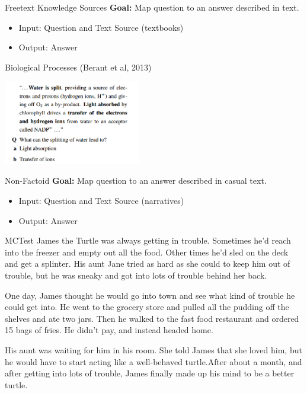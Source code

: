\documentclass{beamer}
\begin{document}
\begin{frame}{Freetext Knowledge Sources}
  \textbf{Goal:} Map question to an answer described in text.

  \begin{itemize}
  \item Input: Question and Text Source (textbooks)
  \item Output: Answer
  \end{itemize}
\end{frame}


\begin{frame}{Biological Processes (Berant et al, 2013)}
  \begin{center}
    \includegraphics[width=6cm]{water}
  \end{center}
\end{frame}

  

\begin{frame}{Non-Factoid}
  \textbf{Goal:} Map question to an answer described in casual text.

  \begin{itemize}
  \item Input: Question and Text Source (narratives)
  \item Output: Answer
  \end{itemize}
  
\end{frame}

\begin{frame}{MCTest}
  James the Turtle was always getting in trouble. Sometimes he'd reach into the freezer and empty out all the food. Other times he'd sled on the deck and get a splinter. His aunt Jane tried as hard as she could to keep him out of trouble, but he was sneaky and got into lots of trouble behind her back.

  One day, James thought he would go into town and see what kind of trouble he could get into. He went to the grocery store and pulled all the pudding off the shelves and ate two jars. Then he walked to the fast food restaurant and ordered 15 bags of fries. He didn't pay, and instead headed home.

  His aunt was waiting for him in his room. She told James that she loved him, but he would have to start acting like a well-behaved turtle.After about a month, and after getting into lots of trouble, James finally made up his mind to be a better turtle.

\end{frame}
\end{document}
